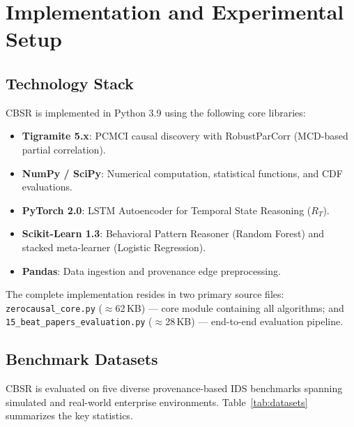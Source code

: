 \chapter{Implementation and Experimental Setup}
\label{ch:implementation}

\section{Technology Stack}

CBSR is implemented in Python 3.9 using the following core libraries:
\begin{itemize}
\item \textbf{Tigramite 5.x}: PCMCI causal discovery with RobustParCorr (MCD-based partial correlation).
\item \textbf{NumPy / SciPy}: Numerical computation, statistical functions, and CDF evaluations.
\item \textbf{PyTorch 2.0}: LSTM Autoencoder for Temporal State Reasoning ($R_T$).
\item \textbf{Scikit-Learn 1.3}: Behavioral Pattern Reasoner (Random Forest) and stacked meta-learner (Logistic Regression).
\item \textbf{Pandas}: Data ingestion and provenance edge preprocessing.
\end{itemize}

The complete implementation resides in two primary source files:
\texttt{zerocausal\_core.py} ($\approx$62\,KB) — core module containing all algorithms; and
\texttt{15\_beat\_papers\_evaluation.py} ($\approx$28\,KB) — end-to-end evaluation pipeline.


\section{Benchmark Datasets}
\label{sec:datasets}

CBSR is evaluated on five diverse provenance-based IDS benchmarks spanning simulated and
real-world enterprise environments. Table~\ref{tab:datasets} summarizes the key statistics.

